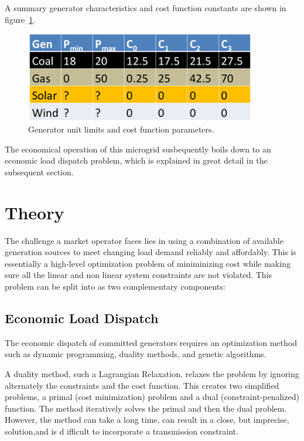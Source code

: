 \documentclass[a4paper]{article}
\begin{document}
A summary generator characteristics and cost function constants are shown in figure~\ref{fig:FIG2}. 


\begin{figure}[h!]
\centering
\includegraphics[width=0.9\textwidth, height=0.25\textheight]{FIG2.png}
\caption{\label{fig:FIG2}Generator unit limits and cost function parameters.}
\end{figure}

The economical operation of this microgrid susbequently boils down to an economic load dispatch problem, which is explained in great detail in the subsequent section.

\section{Theory}
The challenge a market operator faces lies in using a combination of available generation sources to meet changing load demand reliably and affordably. This is essentially a high-level optimization problem of miniminizing cost while making sure all the linear and non linear system constraints are not violated. This problem can be split into as two complementary components:


\subsection{Economic Load Dispatch}

The economic dispatch of committed generators requires an optimization method such as dynamic programming, duality methods, and genetic algorithms.

A duality method, such a Lagrangian Relaxation, relaxes the problem by ignoring alternately the constraints and the cost function. This creates two simplified problems, a primal (cost minimization) problem and a dual (constraint-penalized) function. The method iteratively solves the primal and then the dual problem. However, the method can take a long time, can result in a close, but imprecise, solution,and is d ifficult to incorporate a transmission constraint.
\end{document}

